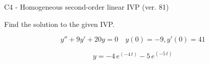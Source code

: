 \begin{exercise}
  \begin{exerciseTitle}C4 - Homogeneous second-order linear IVP (ver. 81)\end{exerciseTitle}
  \begin{exerciseStatement}
    
Find the solution to the given IVP.

    
\[y''+9y'+20y = 0 \hspace{1em} y(0) = -9 , y'(0) = 41\]

  \end{exerciseStatement}
  \begin{exerciseAnswer}
    
\[y= -4 \, e^{\left(-4 \, t\right)} - 5 \, e^{\left(-5 \, t\right)}\]

  \end{exerciseAnswer}
\end{exercise}